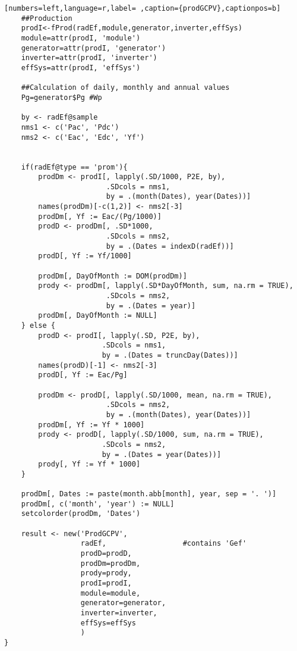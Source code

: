\begin{lstlisting}[numbers=left,language=r,label= ,caption={prodGCPV},captionpos=b]
    ##Production
    prodI<-fProd(radEf,module,generator,inverter,effSys)
    module=attr(prodI, 'module')
    generator=attr(prodI, 'generator')
    inverter=attr(prodI, 'inverter')
    effSys=attr(prodI, 'effSys')

    ##Calculation of daily, monthly and annual values
    Pg=generator$Pg #Wp

    by <- radEf@sample
    nms1 <- c('Pac', 'Pdc')
    nms2 <- c('Eac', 'Edc', 'Yf')


    if(radEf@type == 'prom'){
        prodDm <- prodI[, lapply(.SD/1000, P2E, by),
                        .SDcols = nms1,
                        by = .(month(Dates), year(Dates))]
        names(prodDm)[-c(1,2)] <- nms2[-3]
        prodDm[, Yf := Eac/(Pg/1000)]
        prodD <- prodDm[, .SD*1000,
                        .SDcols = nms2,
                        by = .(Dates = indexD(radEf))]
        prodD[, Yf := Yf/1000]

        prodDm[, DayOfMonth := DOM(prodDm)]
        prody <- prodDm[, lapply(.SD*DayOfMonth, sum, na.rm = TRUE),
                        .SDcols = nms2,
                        by = .(Dates = year)]
        prodDm[, DayOfMonth := NULL]
    } else {
        prodD <- prodI[, lapply(.SD, P2E, by),
                       .SDcols = nms1,
                       by = .(Dates = truncDay(Dates))]
        names(prodD)[-1] <- nms2[-3]
        prodD[, Yf := Eac/Pg]

        prodDm <- prodD[, lapply(.SD/1000, mean, na.rm = TRUE),
                        .SDcols = nms2,
                        by = .(month(Dates), year(Dates))]
        prodDm[, Yf := Yf * 1000]
        prody <- prodD[, lapply(.SD/1000, sum, na.rm = TRUE),
                       .SDcols = nms2,
                       by = .(Dates = year(Dates))]
        prody[, Yf := Yf * 1000]
    }

    prodDm[, Dates := paste(month.abb[month], year, sep = '. ')]
    prodDm[, c('month', 'year') := NULL]
    setcolorder(prodDm, 'Dates')

    result <- new('ProdGCPV',
                  radEf,                  #contains 'Gef'
                  prodD=prodD,
                  prodDm=prodDm,
                  prody=prody,
                  prodI=prodI,
                  module=module,
                  generator=generator,
                  inverter=inverter,
                  effSys=effSys
                  )
}
\end{lstlisting}
